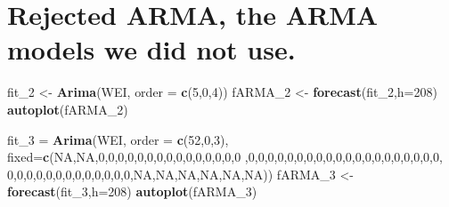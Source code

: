 \documentclass[]{article}
\newenvironment{Shaded}{\begin{snugshade}}{\end{snugshade}}
\newcommand{\KeywordTok}[1]{\textcolor[rgb]{0.13,0.29,0.53}{\textbf{#1}}}
\newcommand{\DataTypeTok}[1]{\textcolor[rgb]{0.13,0.29,0.53}{#1}}
\newcommand{\DecValTok}[1]{\textcolor[rgb]{0.00,0.00,0.81}{#1}}
\newcommand{\StringTok}[1]{\textcolor[rgb]{0.31,0.60,0.02}{#1}}
\newcommand{\OtherTok}[1]{\textcolor[rgb]{0.56,0.35,0.01}{#1}}
\newcommand{\NormalTok}[1]{#1}
\begin{document}
\section{Rejected ARMA, the ARMA models we did not
use.}\label{rejected-arma-the-arma-models-we-did-not-use.}

\begin{Shaded}
\begin{Highlighting}[]
\NormalTok{fit_}\DecValTok{2}\NormalTok{ <-}\StringTok{ }\KeywordTok{Arima}\NormalTok{(WEI, }\DataTypeTok{order =} \KeywordTok{c}\NormalTok{(}\DecValTok{5}\NormalTok{,}\DecValTok{0}\NormalTok{,}\DecValTok{4}\NormalTok{)) }
\NormalTok{fARMA_}\DecValTok{2}\NormalTok{ <-}\StringTok{ }\KeywordTok{forecast}\NormalTok{(fit_}\DecValTok{2}\NormalTok{,}\DataTypeTok{h=}\DecValTok{208}\NormalTok{)}
\KeywordTok{autoplot}\NormalTok{(fARMA_}\DecValTok{2}\NormalTok{)}

\NormalTok{fit_}\DecValTok{3}\NormalTok{ =}\StringTok{ }\KeywordTok{Arima}\NormalTok{(WEI, }\DataTypeTok{order =} \KeywordTok{c}\NormalTok{(}\DecValTok{52}\NormalTok{,}\DecValTok{0}\NormalTok{,}\DecValTok{3}\NormalTok{),}
              \DataTypeTok{fixed=}\KeywordTok{c}\NormalTok{(}\OtherTok{NA}\NormalTok{,}\OtherTok{NA}\NormalTok{,}\DecValTok{0}\NormalTok{,}\DecValTok{0}\NormalTok{,}\DecValTok{0}\NormalTok{,}\DecValTok{0}\NormalTok{,}\DecValTok{0}\NormalTok{,}\DecValTok{0}\NormalTok{,}\DecValTok{0}\NormalTok{,}\DecValTok{0}\NormalTok{,}\DecValTok{0}\NormalTok{,}\DecValTok{0}\NormalTok{,}\DecValTok{0}\NormalTok{,}\DecValTok{0}\NormalTok{,}\DecValTok{0}\NormalTok{,}\DecValTok{0}\NormalTok{,}\DecValTok{0}
\NormalTok{              ,}\DecValTok{0}\NormalTok{,}\DecValTok{0}\NormalTok{,}\DecValTok{0}\NormalTok{,}\DecValTok{0}\NormalTok{,}\DecValTok{0}\NormalTok{,}\DecValTok{0}\NormalTok{,}\DecValTok{0}\NormalTok{,}\DecValTok{0}\NormalTok{,}\DecValTok{0}\NormalTok{,}\DecValTok{0}\NormalTok{,}\DecValTok{0}\NormalTok{,}\DecValTok{0}\NormalTok{,}\DecValTok{0}\NormalTok{,}\DecValTok{0}\NormalTok{,}\DecValTok{0}\NormalTok{,}\DecValTok{0}\NormalTok{,}\DecValTok{0}\NormalTok{,}\DecValTok{0}\NormalTok{,}\DecValTok{0}\NormalTok{,}\DecValTok{0}\NormalTok{,}
        \DecValTok{0}\NormalTok{,}\DecValTok{0}\NormalTok{,}\DecValTok{0}\NormalTok{,}\DecValTok{0}\NormalTok{,}\DecValTok{0}\NormalTok{,}\DecValTok{0}\NormalTok{,}\DecValTok{0}\NormalTok{,}\DecValTok{0}\NormalTok{,}\DecValTok{0}\NormalTok{,}\DecValTok{0}\NormalTok{,}\DecValTok{0}\NormalTok{,}\DecValTok{0}\NormalTok{,}\DecValTok{0}\NormalTok{,}\OtherTok{NA}\NormalTok{,}\OtherTok{NA}\NormalTok{,}\OtherTok{NA}\NormalTok{,}\OtherTok{NA}\NormalTok{,}\OtherTok{NA}\NormalTok{,}\OtherTok{NA}\NormalTok{))}
\NormalTok{fARMA_}\DecValTok{3}\NormalTok{ <-}\StringTok{ }\KeywordTok{forecast}\NormalTok{(fit_}\DecValTok{3}\NormalTok{,}\DataTypeTok{h=}\DecValTok{208}\NormalTok{)}
\KeywordTok{autoplot}\NormalTok{(fARMA_}\DecValTok{3}\NormalTok{)}
\end{Highlighting}
\end{Shaded}
\end{document}
